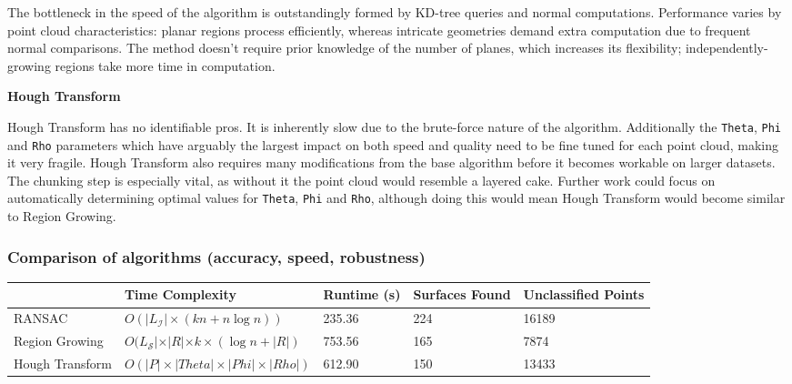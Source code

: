 \documentclass[a4paper,9pt]{article}
\begin{document}
The bottleneck in the speed of the algorithm is outstandingly formed by KD-tree queries and normal computations. Performance varies by point cloud characteristics: planar regions process efficiently, whereas intricate geometries demand extra computation due to frequent normal comparisons. The method doesn't require prior knowledge of the number of planes, which increases its flexibility; independently-growing regions take more time in computation.
\\\par

\textbf{Hough Transform}
\par
Hough Transform has no identifiable pros. It is inherently slow due to the brute-force nature of the algorithm. Additionally the \verb|Theta|, \verb|Phi| and \verb|Rho| parameters which have arguably the largest impact on both speed and quality need to be fine tuned for each point cloud, making it very fragile. Hough Transform also requires many modifications from the base algorithm before it becomes workable on larger datasets. The chunking step is especially vital, as without it the point cloud would resemble a layered cake. Further work could focus on automatically determining optimal values for \verb|Theta|, \verb|Phi| and \verb|Rho|, although doing this would mean Hough Transform would become similar to Region Growing.



\subsubsection{Comparison of algorithms (accuracy, speed, robustness)}

\begin{table}[H]
\begin{tabularx}{\textwidth}{lllll}
\hline
 & Time Complexity & Runtime (s) & Surfaces Found & Unclassified Points \\ \hline
RANSAC & $O(|L_\mathcal{I}|\times(kn + n\log n))$ & 235.36 & 224 & 16189 \\
Region Growing & $O(L_\mathcal{S}|\times |R| \times k \times (\log n + |R|)$ & 753.56 & 165 & 7874 \\
Hough Transform & $O(|P|\times|Theta|\times|Phi|\times|Rho|)$ & 612.90 & 150 & 13433 \\ \hline
\end{tabularx}
\end{table}



\end{document}
